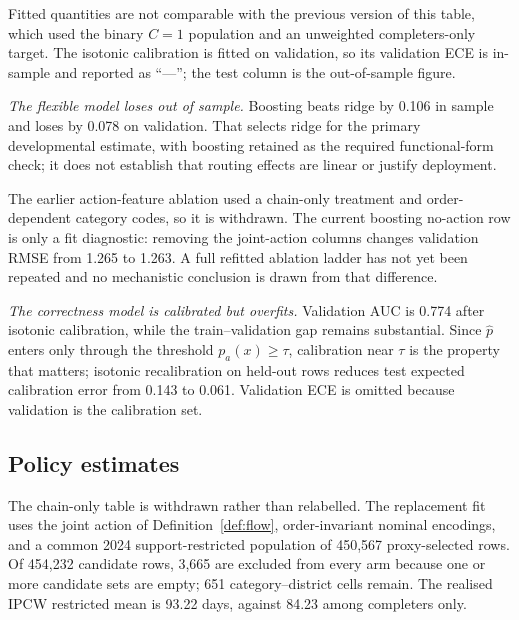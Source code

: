 \documentclass[11pt,a4paper]{article}
\theoremstyle{plain}
\theoremstyle{definition}
\theoremstyle{remark}
\begin{document}
Fitted quantities are not comparable with the previous version of this table, which used the
binary $C=1$ population and an unweighted completers-only target. The isotonic calibration is
fitted on validation, so its validation ECE is in-sample and reported as ``---''; the test
column is the out-of-sample figure.

\emph{The flexible model loses out of sample.} Boosting beats ridge by 0.106 in sample and loses
by 0.078 on validation. That selects ridge for the primary developmental estimate, with boosting
retained as the required functional-form check; it does not establish that routing effects are
linear or justify deployment.

The earlier action-feature ablation used a chain-only treatment and order-dependent category
codes, so it is withdrawn. The current boosting no-action row is only a fit diagnostic: removing
the joint-action columns changes validation RMSE from 1.265 to 1.263. A full refitted ablation
ladder has not yet been repeated and no mechanistic conclusion is drawn from that difference.

\emph{The correctness model is calibrated but overfits.} Validation AUC is 0.774 after isotonic
calibration, while the train--validation gap remains substantial.
Since $\hat p$ enters only through the threshold $p_a(x)\ge\tau$, calibration near $\tau$ is the
property that matters; isotonic recalibration on held-out rows reduces test expected calibration
error from 0.143 to 0.061. Validation ECE is omitted because validation is the calibration set.

\subsection{Policy estimates}\label{sec:ev-provisional}

The chain-only table is withdrawn rather than relabelled. The replacement fit uses the joint
action of Definition~\ref{def:flow}, order-invariant nominal encodings, and a common 2024
support-restricted population of 450,567 proxy-selected rows. Of 454,232 candidate rows, 3,665
are excluded from every arm because one or more candidate sets are empty; 651
category--district cells remain. The realised IPCW restricted mean is 93.22 days, against 84.23
among completers only.
\end{document}
